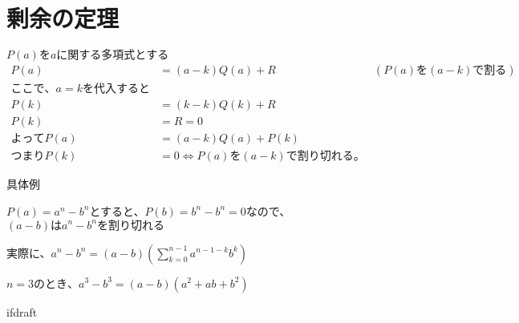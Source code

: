 \documentclass{jsarticle}
\begin{document}
 \fi

\section{剰余の定理}

$P(a)をaに関する多項式とする$
\begin{align*}
   P(a) &= (a - k)Q(a) + R \qquad &\text{$(P(a)を(a-k)で割る)$} \\
   ここで、a = kを代入すると \\
   P(k) &= (k - k)Q(k) + R \\
   P(k) &= R = 0 \\
   よって P(a) &= (a-k)Q(a) + P(k)  \\
   つまり P(k) &= 0 \Leftrightarrow P(a)を(a-k)で割り切れる。
\end{align*}

具体例

$P(a) = a^n - b^n$とすると、$P(b) = b^n - b^n = 0$なので、$(a-b)はa^n - b^nを割り切れる$

実際に、$a^n - b^n = (a - b)(\sum_{k = 0}^{n-1} a^{n-1-k}b^k)$

$n = 3のとき、a^3 - b^3 = (a-b)(a^2 + ab + b^2)$

    \expandafter\ifx\csname ifdraft\endcsname\relax
\end{document}
